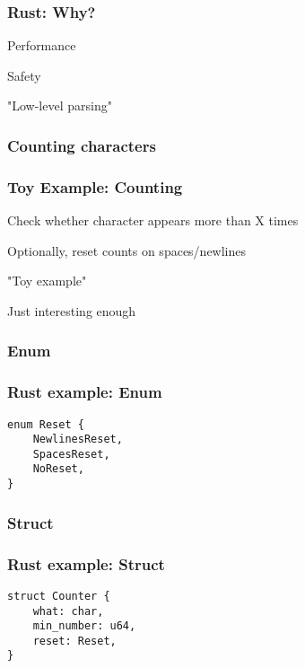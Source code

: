 \documentclass{article}
\begin{document}
\begin{frame}
\frametitle{Rust: Why?}

\pause

Performance \pause

Safety \pause

"Low-level parsing"

\end{frame}

\hypertarget{counting-characters}{%
\subsubsection{Counting characters}\label{counting-characters}}

\begin{frame}
\frametitle{Toy Example: Counting}

\pause

Check whether character appears more than X times \pause

Optionally, reset counts on spaces/newlines \pause

"Toy example" \pause

Just interesting enough

\end{frame}

\hypertarget{enum}{%
\subsubsection{Enum}\label{enum}}

\begin{frame}[fragile]
\frametitle{Rust example: Enum}

\begin{lstlisting}
enum Reset {
    NewlinesReset,
    SpacesReset,
    NoReset,
}
\end{lstlisting}
\end{frame}

\hypertarget{struct}{%
\subsubsection{Struct}\label{struct}}

\begin{frame}[fragile]
\frametitle{Rust example: Struct}

\begin{lstlisting}
struct Counter {
    what: char,
    min_number: u64,
    reset: Reset, 
}
\end{lstlisting}
\end{frame}
\end{document}
